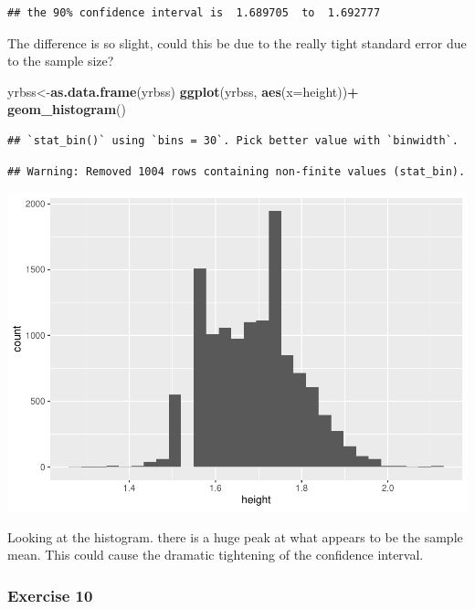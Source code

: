 \documentclass[
]{article}
\newenvironment{Shaded}{\begin{snugshade}}{\end{snugshade}}
\newcommand{\DataTypeTok}[1]{\textcolor[rgb]{0.13,0.29,0.53}{#1}}
\newcommand{\KeywordTok}[1]{\textcolor[rgb]{0.13,0.29,0.53}{\textbf{#1}}}
\newcommand{\NormalTok}[1]{#1}
\newcommand{\OperatorTok}[1]{\textcolor[rgb]{0.81,0.36,0.00}{\textbf{#1}}}
\newcommand{\StringTok}[1]{\textcolor[rgb]{0.31,0.60,0.02}{#1}}
\begin{document}
\begin{verbatim}
## the 90% confidence interval is  1.689705  to  1.692777
\end{verbatim}

The difference is so slight, could this be due to the really tight
standard error due to the sample size?

\begin{Shaded}
\begin{Highlighting}[]
\NormalTok{yrbss<-}\KeywordTok{as.data.frame}\NormalTok{(yrbss)}
\KeywordTok{ggplot}\NormalTok{(yrbss, }\KeywordTok{aes}\NormalTok{(}\DataTypeTok{x=}\NormalTok{height))}\OperatorTok{+}
\StringTok{  }\KeywordTok{geom_histogram}\NormalTok{()}
\end{Highlighting}
\end{Shaded}

\begin{verbatim}
## `stat_bin()` using `bins = 30`. Pick better value with `binwidth`.
\end{verbatim}

\begin{verbatim}
## Warning: Removed 1004 rows containing non-finite values (stat_bin).
\end{verbatim}

\includegraphics{lab-7_files/figure-latex/unnamed-chunk-15-1.pdf}

Looking at the histogram. there is a huge peak at what appears to be the
sample mean. This could cause the dramatic tightening of the confidence
interval.

\hypertarget{exercise-10}{%
\subsubsection{Exercise 10}\label{exercise-10}}
\end{document}
